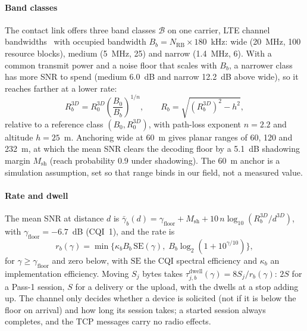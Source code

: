 \documentclass[conference]{IEEEtran}
\begin{document}
\paragraph{Band classes}
The contact link offers three band classes $\mathcal{B}$ on one carrier, LTE
channel bandwidths~\cite{3gpp36104} with occupied bandwidth
$B_b=N_{\mathrm{RB}}\times180$~kHz: \textsf{wide} (20~MHz, 100 resource blocks),
\textsf{medium} (5~MHz, 25) and \textsf{narrow} (1.4~MHz, 6). With a common
transmit power and a noise floor that scales with $B_b$, a narrower class has
more SNR to spend (\textsf{medium} 6.0~dB and \textsf{narrow} 12.2~dB above
\textsf{wide}), so it reaches farther at a lower rate:
\begin{equation}
R_b^{3D} = R_0^{3D}\left(\frac{B_0}{B_b}\right)^{1/n},
\qquad
R_b = \sqrt{\left(R_b^{3D}\right)^2 - h^2},
\label{eq:range}
\end{equation}
relative to a reference class $(B_0,R_0^{3D})$, with path-loss exponent $n=2.2$
and altitude $h=25$~m. Anchoring \textsf{wide} at 60~m gives planar ranges of
60, 120 and 232~m, at which the mean SNR clears the decoding floor by a 5.1~dB
shadowing margin $M_{\mathrm{sh}}$ (reach probability 0.9 under shadowing). The
60~m anchor is a simulation assumption, set so that range binds in our field, not
a measured value.

\paragraph{Rate and dwell}
The mean SNR at distance $d$ is
$\bar\gamma_b(d)=\gamma_{\mathrm{floor}}+M_{\mathrm{sh}}+10\,n\log_{10}(R_b^{3D}/d^{3D})$,
with $\gamma_{\mathrm{floor}}=-6.7$~dB (CQI~1), and the rate is
\begin{equation}
r_b(\gamma)=\min\bigl\{\kappa_b B_b\,\mathrm{SE}(\gamma),\;B_b\log_2(1+10^{\gamma/10})\bigr\},
\label{eq:rate}
\end{equation}
for $\gamma\ge\gamma_{\mathrm{floor}}$ and zero below, with $\mathrm{SE}$ the CQI
spectral efficiency and $\kappa_b$ an implementation efficiency. Moving $S_j$
bytes takes $\tau_{j,b}^{\mathrm{dwell}}(\gamma)=8S_j/r_b(\gamma)$: $2S$ for a
Pass-1 session, $S$ for a delivery or the upload, with the dwells at a stop
adding up. The channel only decides whether a device is solicited (not if it is
below the floor on arrival) and how long its session takes; a started session
always completes, and the TCP messages carry no radio effects.
\end{document}
